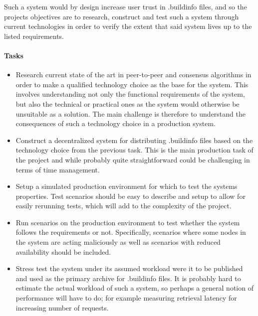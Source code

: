 \documentclass{article}
\begin{document}
Such a system would by design increase user trust in .buildinfo files, and so the projects objectives are to research, construct and test such a system through current technologies in order to verify the extent that said system lives up to the listed requirements. 

\paragraph{Tasks} 

\begin{itemize}
	\item Research current state of the art in peer-to-peer and consensus algorithms in order to make a qualified technology choice as the base for the system. This involves understanding not only the functional requirements of the system, but also the technical or practical ones as the system would otherwise be unsuitable as a solution. The main challenge is therefore to understand the consequences of such a technology choice in a production system.
	\item Construct a decentralized system for distributing .buildinfo files based on the technology choice from the previous task. This is the main production task of the project and while probably quite straightforward could be challenging in terms of time management. 
	\item Setup a simulated production environment for which to test the systems properties. Test scenarios should be easy to describe and setup to allow for easily rerunning tests, which will add to the complexity of the project.
	\item Run scenarios on the production environment to test whether the system follows the requirements or not. Specifically, scenarios where some nodes in the system are acting maliciously as well as scenarios with reduced availability should be included. 
	\item Stress test the system under its assumed workload were it to be published and used as the primary archive for .buildinfo files. It is probably hard to estimate the actual workload of such a system, so perhaps a general notion of performance will have to do; for example measuring retrieval latency for increasing number of requests.
\end{itemize}

\end{document}
